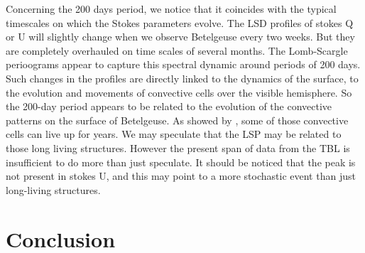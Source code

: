 \documentclass{aa}
\begin{document}

Concerning the 200 days period, we notice that it coincides with  the typical timescales on which the Stokes parameters evolve. 
The 
LSD profiles of stokes Q or U will slightly change when we observe Betelgeuse every two weeks. But they are completely overhauled 
on time scales of several months. The Lomb-Scargle perioograms appear to capture this spectral dynamic around periods of 200 days.
 Such changes in the profiles are directly linked to the dynamics of the surface,  to  the evolution and movements 
of convective cells over the visible hemisphere. So the 200-day period appears to be related to the evolution of the convective patterns 
on the surface of Betelgeuse. 
 As showed by
\cite{lopez_ariste_convective_2018}, some of those convective cells can live up for years. We may speculate
that the LSP may be related to those long living structures. However the present span of data from the TBL is insufficient to do more than
just speculate. It should be noticed that  
 the peak is not present in stokes U, and this may point to a more stochastic event than just long-living structures.





\section{Conclusion}
\end{document}
